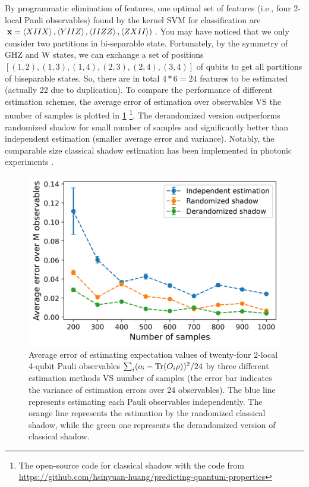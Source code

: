 \documentclass[
aps,
pra,
twocolumn,
floatfix,
]{revtex4-2}
\theoremstyle{plain}
\theoremstyle{definition}
\newcommand{\ob}{O}
\newcommand{\dm}{\rho}
\begin{document}
By programmatic elimination of features, one optimal set of features (i.e., four 2-local Pauli observables) found by the kernel SVM for classification are 
$\vb{x}=\expval{XIIX},\expval{YIIZ},\expval{IIZZ},\expval{ZXII})$.
You may have noticed that we only consider two partitions in bi-separable state.
Fortunately, by the symmetry of GHZ and W states, we can exchange a set of positions $[(1,2),(1,3),(1,4),(2,3),(2,4),(3,4)]$ of qubits to get all partitions of biseparable states. 
So, there are in total $4*6=24$ features to be estimated (actually 22 due to duplication).
To compare the performance of different estimation schemes, the average error of estimation over observables VS the number of samples is plotted in \cref{fig:shadow}
\footnote{The open-source code for classical shadow with the code from \url{https://github.com/hsinyuan-huang/predicting-quantum-properties}}.
The derandomized version outperforms randomized shadow for small number of samples and significantly better than independent estimation (smaller average error and variance).
Notably, the comparable size classical shadow estimation has been implemented in photonic experiments \cite{zhangExperimentalQuantumState2021}.
\begin{figure}[!ht]
	\centering
	\includegraphics[width=.9\linewidth]{./Code/estimation_error_compare_methods.png}
	\caption{Average error of estimating expectation values of twenty-four 2-local 4-qubit Pauli observables $\sum_i (o_i-\Tr(\ob_i\dm))^2/24$ by three different estimation methods VS number of samples (the error bar indicates the variance of estimation errors over 24 observables). The blue line represents estimating each Pauli observables independently. The orange line represents the estimation by the randomized classical shadow, while the green one represents the derandomized version of classical shadow.}
	\label{fig:shadow}
\end{figure}
\end{document}
